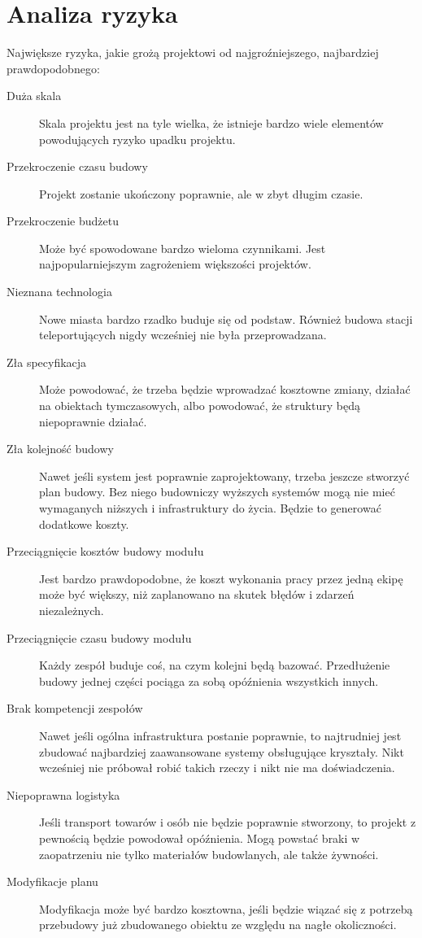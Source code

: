 \section{Analiza ryzyka}
Największe ryzyka, jakie grożą projektowi od najgroźniejszego, najbardziej prawdopodobnego:
\begin{description}
 \item[Duża skala] Skala projektu jest na tyle wielka, że istnieje bardzo wiele elementów powodujących ryzyko upadku projektu.
 \item[Przekroczenie czasu budowy] Projekt zostanie ukończony poprawnie, ale w zbyt długim czasie.
 \item[Przekroczenie budżetu] Może być spowodowane bardzo wieloma czynnikami. Jest najpopularniejszym zagrożeniem większości projektów.
 \item[Nieznana technologia] Nowe miasta bardzo rzadko buduje się od podstaw. Również budowa stacji teleportujących nigdy wcześniej nie była przeprowadzana.
 \item[Zła specyfikacja] Może powodować, że trzeba będzie wprowadzać kosztowne zmiany, działać na obiektach tymczasowych, albo powodować, że struktury będą niepoprawnie działać.
 \item[Zła kolejność budowy] Nawet jeśli system jest poprawnie zaprojektowany, trzeba jeszcze stworzyć plan budowy. Bez niego budowniczy wyższych systemów mogą nie mieć wymaganych niższych i infrastruktury do życia. Będzie to generować dodatkowe koszty.
 \item[Przeciągnięcie kosztów budowy modułu] Jest bardzo prawdopodobne, że koszt wykonania pracy przez jedną ekipę może być większy, niż zaplanowano na skutek błędów i zdarzeń niezależnych.
 \item[Przeciągnięcie czasu budowy modułu] Każdy zespół buduje coś, na czym kolejni będą bazować. Przedłużenie budowy jednej części pociąga za sobą opóźnienia wszystkich innych.
 \item[Brak kompetencji zespołów] Nawet jeśli ogólna infrastruktura postanie poprawnie, to najtrudniej jest zbudować najbardziej zaawansowane systemy obsługujące kryształy. Nikt wcześniej nie próbował robić takich rzeczy i nikt nie ma doświadczenia.
 \item[Niepoprawna logistyka] Jeśli transport towarów i osób nie będzie poprawnie stworzony, to projekt z pewnością będzie powodował opóźnienia. Mogą powstać braki w zaopatrzeniu nie tylko materiałów budowlanych, ale także żywności.
 \item[Modyfikacje planu] Modyfikacja może być bardzo kosztowna, jeśli będzie wiązać się z potrzebą przebudowy już zbudowanego obiektu ze względu na nagłe okoliczności.

\end{description}
